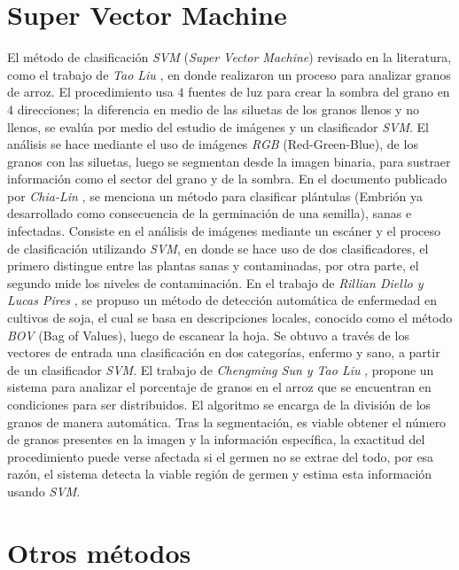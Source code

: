 \section{Super Vector Machine}

El método de clasificación \textit{SVM} (\textit{Super Vector Machine}) revisado en la literatura, como el trabajo de \textit{Tao Liu} \cite{LIU201679}, en donde realizaron un proceso para analizar granos de arroz. El procedimiento usa $4$ fuentes de luz para crear la sombra del grano en $4$ direcciones; la diferencia en medio de las siluetas de los granos llenos y no llenos, se evalúa por medio del estudio de imágenes y un clasificador \textit{SVM}. El análisis se hace mediante el uso de imágenes \textit{RGB} (Red-Green-Blue), de los granos con las siluetas, luego se segmentan desde la imagen binaria, para sustraer información como el sector del grano y de la sombra. En el documento publicado por \textit{Chia-Lin} \cite{CHUNG2016404}, se menciona un método para clasificar plántulas (Embrión ya desarrollado como consecuencia de la germinación de una semilla), sanas e infectadas. Consiste en el análisis de imágenes mediante un escáner y el proceso de clasificación utilizando \textit{SVM}, en donde se hace uso de dos clasificadores, el primero distingue entre las plantas sanas y contaminadas, por otra parte, el segundo mide los niveles de contaminación. En el trabajo de \textit{Rillian Diello y Lucas Pires} \cite{PIRES201648}, se propuso un método de detección automática de enfermedad en cultivos de soja, el cual se basa en descripciones locales, conocido como el método \textit{BOV} (Bag of Values), luego de escanear la hoja. Se obtuvo a través de los vectores de entrada una clasificación en dos categorías, enfermo y sano, a partir de un clasificador \textit{SVM}. El trabajo de \textit{Chengming Sun y Tao Liu} \cite{SUN2014426}, propone un sistema para analizar el porcentaje de granos en el arroz que se encuentran en condiciones para ser distribuidos. El algoritmo se encarga de la división de los granos de manera automática. Tras la segmentación, es viable obtener el número de granos presentes en la imagen y la información específica, la exactitud del procedimiento puede verse afectada si el germen no se extrae del todo, por esa razón, el sistema detecta la viable región de germen y estima esta información usando \textit{SVM}.\\

\section{Otros métodos}

